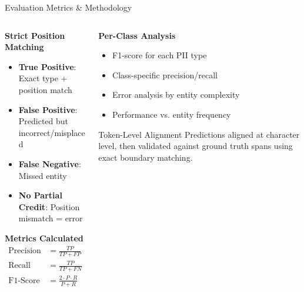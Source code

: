 \documentclass[aspectratio=169]{beamer}
\begin{document}
\begin{frame}{Evaluation Metrics \& Methodology}
\begin{columns}
\begin{column}{0.5\textwidth}
\textbf{Strict Position Matching}
\begin{itemize}
\item \textbf{True Positive}: Exact type + position match
\item \textbf{False Positive}: Predicted but incorrect/misplaced
\item \textbf{False Negative}: Missed entity
\item \textbf{No Partial Credit}: Position mismatch = error
\end{itemize}

\vspace{0.3cm}
\textbf{Metrics Calculated}
\begin{align}
\text{Precision} &= \frac{TP}{TP + FP} \\
\text{Recall} &= \frac{TP}{TP + FN} \\
\text{F1-Score} &= \frac{2 \cdot P \cdot R}{P + R}
\end{align}
\end{column}
\begin{column}{0.5\textwidth}
\textbf{Per-Class Analysis}
\begin{itemize}
\item F1-score for each PII type
\item Class-specific precision/recall
\item Error analysis by entity complexity
\item Performance vs. entity frequency
\end{itemize}

\vspace{0.3cm}
\begin{alertblock}{Token-Level Alignment}
Predictions aligned at character level, then validated against ground truth spans using exact boundary matching.
\end{alertblock}
\end{column}
\end{columns}
\end{frame}
\end{document}

